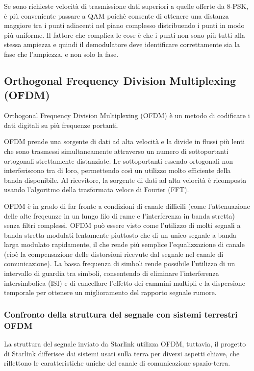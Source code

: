 Se sono richieste velocità di trasmissione dati superiori a quelle offerte da 8-\ac{PSK}, è più conveniente passare a \ac{QAM} poichè consente di ottenere una distanza maggiore tra i punti adiacenti nel piano complesso distribuendo i punti in modo più uniforme.
Il fattore che complica le cose è che i punti non sono più tutti alla stessa ampiezza e quindi il demodulatore deve identificare correttamente sia la fase che l'ampiezza, e non solo la fase.

\subsection{Orthogonal Frequency Division Multiplexing (OFDM)}
Orthogonal Frequency Division Multiplexing (\acs{OFDM}) è un metodo di codificare i dati digitali su più frequenze portanti.

\ac{OFDM} prende una sorgente di dati ad alta velocità e la divide in flussi più lenti che sono trasmessi simultaneamente attraverso un numero di sottoportanti ortogonali strettamente distanziate.
Le sottoportanti essendo ortogonali non interferiscono tra di loro, permettendo così un utilizzo molto efficiente della banda disponibile.
Al ricevitore, la sorgente di dati ad alta velocità è ricomposta usando l'algoritmo della trasformata veloce di Fourier (FFT).

\ac{OFDM} è in grado di far fronte a condizioni di canale difficili (come l'attenuazione delle alte freqeunze in un lungo filo di rame e l'interferenza in banda stretta) senza filtri complessi.
\ac{OFDM} può essere visto come l'utilizzo di molti segnali a banda stretta modulati lentamente piuttosto che di un unico segnale a banda larga modulato rapidamente, il che rende più semplice l'equalizzazione di canale (cioè la compensazione delle distorsioni ricevute dal segnale nel canale di comunicazione).
La bassa frequenza di simboli rende possibile l'utilizzo di un intervallo di guardia tra simboli, consentendo di eliminare l'interferenza intersimbolica (ISI) e di cancellare l'effetto dei cammini multipli e la dispersione temporale per ottenere un miglioramento del rapporto segnale rumore.

\subsubsection{Confronto della struttura del segnale con sistemi terrestri OFDM}
La struttura del segnale inviato da Starlink utilizza \ac{OFDM}, tuttavia, il progetto di Starlink differisce dai sistemi usati sulla terra per diversi aspetti chiave, che riflettono le caratteristiche uniche del canale di comunicazione spazio-terra.

